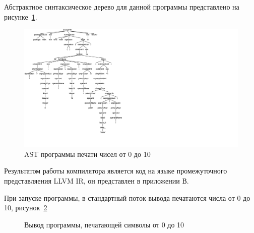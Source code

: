 Абстрактное синтаксическое дерево для данной программы представлено на рисунке~\ref{fig:tree}.
\begin{figure}[h!]
    \centering
    \includegraphics[scale=0.4]{img/tree}
    \caption{AST программы печати чисел от 0 до 10}
    \label{fig:tree}
\end{figure}

Результатом работы компилятора является код на языке промежуточного представляения LLVM IR, он представлен в
приложении В.

При запуске программы, в стандартный поток вывода печатаются числа от 0 до 10, рисунок~\ref{fig:print}
\begin{figure}[h!]
    \centering
    \caption{Вывод программы, печатающей символы от 0 до 10}
    \label{fig:print}
\end{figure}
